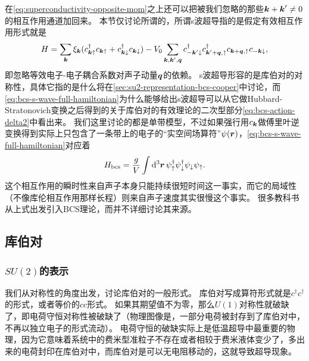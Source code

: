 在\eqref{eq:superconductivity-opposite-mom}之上还可以把被我们忽略的那些$\vb*{k} + \vb*{k}' \neq 0$的相互作用通道加回来。
本节仅讨论所谓的，所谓s波超导指的是假定有效相互作用形式就是
\begin{equation}
    H = \sum_{\vb*{k}} \xi_{\vb*{k}} (c^\dagger_{\vb*{k} \uparrow} c_{\vb*{k} \uparrow} + c^\dagger_{\vb*{k} \downarrow} c_{\vb*{k} \downarrow}) - V_0 \sum_{\vb*{k}, \vb*{k}', \vb*{q}} c^\dagger_{- \vb*{k}' \downarrow} c^\dagger_{\vb*{k}' + \vb*{q}, \uparrow} c_{\vb*{k} + \vb*{q}, \uparrow} c_{- \vb*{k} \downarrow},
    \label{eq:bcs-s-wave-full-hamiltonian}
\end{equation}
即忽略等效电子-电子耦合系数对声子动量$\vb*{q}$的依赖。
s波超导形容的是库伯对的对称性，具体它指的是什么将在\autoref{sec:su2-representation-bcs-cooper}中讨论，而\eqref{eq:bcs-s-wave-full-hamiltonian}为什么能够给出s波超导可以从它做Hubbard-Stratonovich变换之后得到的关于库伯对的有效理论的二次型部分\eqref{eq:bcs-action-delta2}中看出来。
我们这里讨论的都是单带模型，不过如果强行用$c_{\vb*{k}}$做傅里叶逆变换得到实际上只包含了一条带上的电子的“实空间场算符”$\psi(\vb*{r})$，\eqref{eq:bcs-s-wave-full-hamiltonian}对应着
\begin{equation}
    H_\text{bcs} = \frac{g}{V} \int \dd[3]{\vb*{r}} \psi_\uparrow^\dagger \psi_\downarrow^\dagger \psi_\downarrow \psi_\uparrow.
\end{equation}
这个相互作用的瞬时性来自声子本身只能持续很短时间这一事实，而它的局域性（不像库伦相互作用那样长程）则来自声子速度其实很慢这个事实。
很多教科书从上式出发引入BCS理论，而并不详细讨论其来源。

\subsection{库伯对}

\subsubsection{$SU(2)$的表示}\label{sec:su2-representation-bcs-cooper}

我们从对称性的角度出发，讨论库伯对的一般形式。
库伯对写成算符形式就是${c}^\dagger {c}^\dagger$的形式，或者等价的${c} {c}$形式。
如果其期望值不为零，那么$U(1)$对称性就破缺了，即电荷守恒对称性被破缺了（物理图像是，一部分电荷被封存到了库伯对中，不再以独立电子的形式流动）。
电荷守恒的破缺实际上是低温超导中最重要的物理，因为它意味着系统中的费米型准粒子不存在或者相较于费米液体变少了，多出来的电荷封印在库伯对中，而库伯对是可以无电阻移动的，这就导致超导现象。

